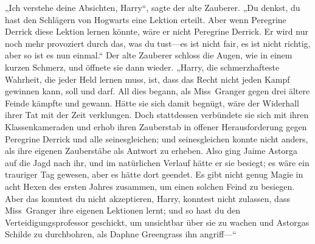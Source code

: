 „Ich verstehe deine Absichten, Harry“, sagte der alte Zauberer.
„Du denkst, du hast den Schlägern von Hogwarts eine Lektion erteilt. Aber wenn Peregrine Derrick diese Lektion lernen könnte, wäre er nicht Peregrine Derrick. Er wird nur noch mehr provoziert durch das, was du tust—es ist nicht fair, es ist nicht richtig, aber so ist es nun einmal.“ Der alte Zauberer schloss die Augen, wie in einem kurzen Schmerz, und öffnete sie dann wieder.
„Harry, die schmerzhafteste Wahrheit, die jeder Held lernen muss, ist, dass das Recht nicht jeden Kampf gewinnen kann, soll und darf. All dies begann, als Miss~Granger gegen drei ältere Feinde kämpfte und gewann. Hätte sie sich damit begnügt, wäre der Widerhall ihrer Tat mit der Zeit verklungen. Doch stattdessen verbündete sie sich mit ihren Klassenkameraden und erhob ihren Zauberstab in offener Herausforderung gegen Peregrine Derrick und alle seinesgleichen; und seinesgleichen konnte nicht anders, als ihre eigenen Zauberstäbe als Antwort zu erheben. Also ging Jaime Astorga auf die Jagd nach ihr, und im natürlichen Verlauf hätte er sie besiegt; es wäre ein trauriger Tag gewesen, aber es hätte dort geendet. Es gibt nicht genug Magie in acht Hexen des ersten Jahres zusammen, um einen solchen Feind zu besiegen. Aber das konntest du nicht akzeptieren, Harry, konntest nicht zulassen, dass Miss~Granger ihre eigenen Lektionen lernt; und so hast du den Verteidigungsprofessor geschickt, um unsichtbar über sie zu wachen und Astorgas Schilde zu durchbohren, als Daphne Greengrass ihn angriff—“

